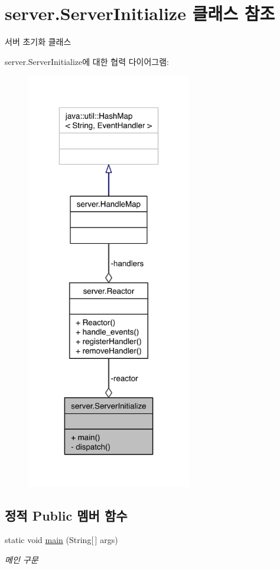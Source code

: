 \hypertarget{classserver_1_1_server_initialize}{\section{server.\-Server\-Initialize 클래스 참조}
\label{classserver_1_1_server_initialize}
}


서버 초기화 클래스  




server.\-Server\-Initialize에 대한 협력 다이어그램\-:\nopagebreak
\begin{figure}[H]
\begin{center}
\leavevmode
\includegraphics[width=204pt]{classserver_1_1_server_initialize__coll__graph}
\end{center}
\end{figure}
\subsection*{정적 Public 멤버 함수}
\begin{DoxyCompactItemize}
\item 
static void \hyperlink{classserver_1_1_server_initialize_ac00ce4d8c80d0da9e5c4011101f8ed28}{main} (String\mbox{[}$\,$\mbox{]} args)
\begin{DoxyCompactList}\small\item\em 메인 구문 \end{DoxyCompactList}\end{DoxyCompactItemize}
